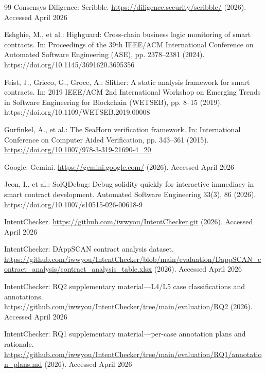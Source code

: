 \documentclass[pdflatex,sn-basic]{sn-jnl}%
\theoremstyle{thmstyleone}%
\theoremstyle{thmstyletwo}%
\theoremstyle{thmstylethree}%
\begin{document}
\begin{thebibliography}{99}
Consensys Diligence: Scribble. \url{https://diligence.security/scribble/} (2026). Accessed April 2026

Eshghie, M., et al.: Highguard: Cross-chain business logic monitoring of smart contracts. In: Proceedings of the 39th IEEE/ACM International Conference on Automated Software Engineering (ASE), pp. 2378--2381 (2024). https://doi.org/10.1145/3691620.3695356

Feist, J., Grieco, G., Groce, A.: Slither: A static analysis framework for smart contracts. In: 2019 IEEE/ACM 2nd International Workshop on Emerging Trends in Software Engineering for Blockchain (WETSEB), pp. 8--15 (2019). https://doi.org/10.1109/WETSEB.2019.00008

Gurfinkel, A., et al.: The SeaHorn verification framework. In: International Conference on Computer Aided Verification, pp. 343--361 (2015). \url{https://doi.org/10.1007/978-3-319-21690-4_20}

Google: Gemini. \url{https://gemini.google.com/} (2026). Accessed April 2026

Jeon, I., et al.: SolQDebug: Debug solidity quickly for interactive immediacy in smart contract development. Automated Software Engineering 33(3), 86 (2026). https://doi.org/10.1007/s10515-026-00618-9

IntentChecker. \url{https://github.com/iwwyou/IntentChecker.git} (2026). Accessed April 2026

IntentChecker: DAppSCAN contract analysis dataset. \url{https://github.com/iwwyou/IntentChecker/blob/main/evaluation/DappSCAN_contract_analysis/contract_analysis_table.xlsx} (2026). Accessed April 2026

IntentChecker: RQ2 supplementary material---L4/L5 case classifications and annotations. \url{https://github.com/iwwyou/IntentChecker/tree/main/evaluation/RQ2} (2026). Accessed April 2026

IntentChecker: RQ1 supplementary material---per-case annotation plans and rationale. \url{https://github.com/iwwyou/IntentChecker/tree/main/evaluation/RQ1/annotation_plans.md} (2026). Accessed April 2026


\end{thebibliography}
\end{document}
